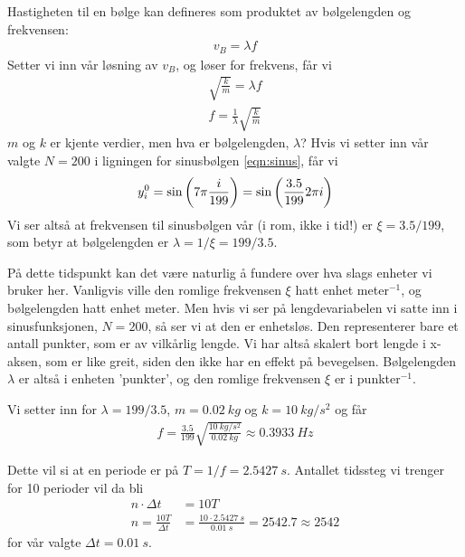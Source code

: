 \documentclass[12p,a4paper]{report}
\begin{document}
Hastigheten til en bølge kan defineres som produktet av bølgelengden og frekvensen:
\begin{align*}
v_B = \lambda f
\end{align*}
Setter vi inn vår løsning av $v_B$, og løser for frekvens, får vi
\begin{align*}
\sqrt{\frac{k}{m}} = \lambda f\\
f = \frac{1}{\lambda} \sqrt{\frac{k}{m}}
\end{align*}
$m$ og $k$ er kjente verdier, men hva er bølgelengden, $\lambda$? Hvis vi setter inn vår valgte $N = 200$ i ligningen for sinusbølgen \ref{eqn:sinus}, får vi
\begin{align*}
y_i^0 = \sin\qty(7\pi\frac{i}{199}) = \sin\qty(\frac{3.5}{199}2\pi i )
\end{align*}
Vi ser altså at frekvensen til sinusbølgen vår (i rom, ikke i tid!) er $\xi = 3.5/199$, som betyr at bølgelengden er $\lambda = 1/\xi = 199/3.5$.

På dette tidspunkt kan det være naturlig å fundere over hva slags enheter vi bruker her. Vanligvis ville den romlige frekvensen $\xi$ hatt enhet meter$^{-1}$, og bølgelengden hatt enhet meter. Men hvis vi ser på lengdevariabelen vi satte inn i sinusfunksjonen, $N=200$, så ser vi at den er enhetsløs. Den representerer bare et antall punkter, som er av vilkårlig lengde. Vi har altså skalert bort lengde i x-aksen, som er like greit, siden den ikke har en effekt på bevegelsen. Bølgelengden $\lambda$ er altså i enheten 'punkter', og den romlige frekvensen $\xi$ er i punkter$^{-1}$.

Vi setter inn for $\lambda = 199/3.5$, $m = \SI{0.02}{kg}$ og $k = \SI{10}{kg/s^2}$ og får
\begin{align}\label{eqn:ana_freq}
f = \frac{3.5}{199}\sqrt{\frac{\SI{10}{kg/s^2}}{\SI{0.02}{kg}}} \approx \SI{0.3933}{Hz}
\end{align}

Dette vil si at en periode er på $T = 1/f = \SI{2.5427}{s}$. Antallet tidssteg vi trenger for 10 perioder vil da bli
\begin{align*}
n\cdot \Delta t &= 10T\\
n = \frac{10T}{\Delta t} &= \frac{10\cdot \SI{2.5427}{s}}{\SI{0.01}{s}} = 2542.7 \approx 2542
\end{align*}
for vår valgte $\Delta t = \SI{0.01}{s}$.
\end{document}
